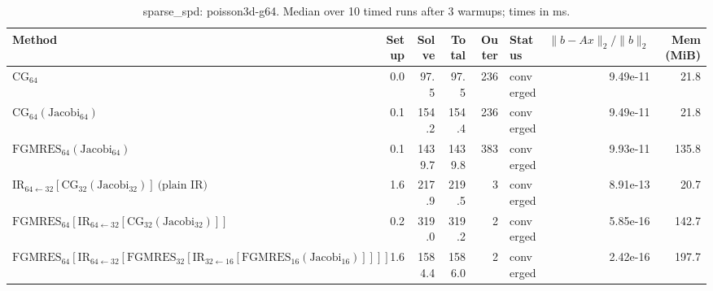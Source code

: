 \begin{table}[t]
\centering
\small
\caption{sparse_spd: poisson3d-g64. Median over 10 timed runs after 3 warmups; times in ms.}
\label{tab:sparse_spd-poisson3d-g64}
\begin{tabular}{lrrrrlrr}
\hline
Method & Setup & Solve & Total & Outer & Status & $\|b-Ax\|_2/\|b\|_2$ & Mem (MiB) \\
\hline
$\mathrm{CG}_{64}$ & 0.0 & 97.5 & 97.5 & 236 & converged & 9.49e-11 & 21.8 \\
$\mathrm{CG}_{64}(\mathrm{Jacobi}_{64})$ & 0.1 & 154.2 & 154.4 & 236 & converged & 9.49e-11 & 21.8 \\
$\mathrm{FGMRES}_{64}(\mathrm{Jacobi}_{64})$ & 0.1 & 1439.7 & 1439.8 & 383 & converged & 9.93e-11 & 135.8 \\
$\mathrm{IR}_{64\leftarrow 32}[\mathrm{CG}_{32}(\mathrm{Jacobi}_{32})]\ \text{(plain IR)}$ & 1.6 & 217.9 & 219.5 & 3 & converged & 8.91e-13 & 20.7 \\
$\mathrm{FGMRES}_{64}[\mathrm{IR}_{64\leftarrow 32}[\mathrm{CG}_{32}(\mathrm{Jacobi}_{32})]]$ & 0.2 & 319.0 & 319.2 & 2 & converged & 5.85e-16 & 142.7 \\
$\mathrm{FGMRES}_{64}[\mathrm{IR}_{64\leftarrow 32}[\mathrm{FGMRES}_{32}[\mathrm{IR}_{32\leftarrow 16}[\mathrm{FGMRES}_{16}(\mathrm{Jacobi}_{16})]]]]$ & 1.6 & 1584.4 & 1586.0 & 2 & converged & 2.42e-16 & 197.7 \\
\hline
\end{tabular}
\end{table}
